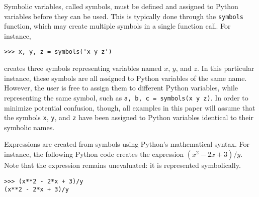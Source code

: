 
Symbolic variables, called symbols, must be defined and assigned to
Python variables before they can be used. This is typically done through the
\texttt{symbols} function, which may create multiple symbols in a single
function call. For instance,
\begin{verbatim}
>>> x, y, z = symbols('x y z')
\end{verbatim}
creates three symbols representing variables named $x$, $y$, and $z$. In this
particular instance, these symbols are all assigned to Python variables of the
same name. However, the user is free to assign them to different
Python variables, while representing the same symbol, such as
\texttt{a, b, c = symbols(\textquotesingle{}x y z\textquotesingle{})}.
In order to minimize potential confusion, though, all examples in this paper will
assume that
the symbols \verb|x|, \verb|y|, and \verb|z| have been assigned to Python variables
identical to their symbolic names.

Expressions are created from symbols using Python's mathematical syntax.  For
instance, the following Python code creates the expression $(x^2 - 2x + 3)/y$.
Note that the expression remains unevaluated: it is represented symbolically.

\begin{verbatim}
>>> (x**2 - 2*x + 3)/y
(x**2 - 2*x + 3)/y
\end{verbatim}
